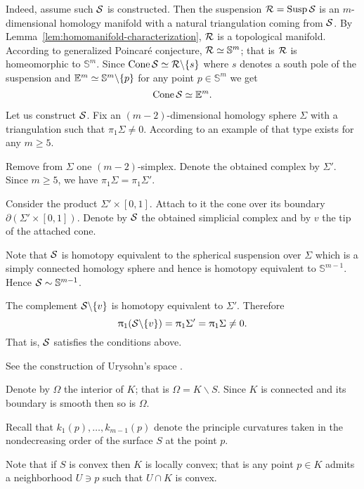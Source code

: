 Indeed, assume such $\mathcal{S}$ is constructed.
Then the suspension
$\spc{R}\z=\Susp\spc{S}$
is an $m$-dimensional homology manifold with a natural triangulation coming from $\mathcal{S}$.
By Lemma~\ref{lem:homomanifold-characterization},
$\mathcal{R}$ is a topological manifold.
According to generalized Poincar\'{e} conjecture,
$\mathcal{R}\simeq\mathbb{S}^m$;
that is
$\mathcal{R}$ is homeomorphic to $\mathbb{S}^m$.
Since $\mathop{\rm Cone}\nolimits \mathcal{S}\simeq \mathcal{R}\backslash\{s\}$ where $s$ denotes a south pole of the suspension 
and $\mathbb{E}^m\simeq \mathbb{S}^m\backslash\{p\}$
for any point $p\in \mathbb{S}^m$
we get 
\[\mathop{\rm Cone}\nolimits \mathcal{S}\simeq\mathbb{E}^m.\]

Let us construct $\mathcal{S}$.
Fix an $(m-2)$-dimensional homology sphere $\Sigma$ with a triangulation such that $\pi_1\Sigma\ne0$.
According to \cite{kervaire} %
an example of that type exists for any $m\ge 5$.

Remove from $\Sigma$ one $(m-2)$-simplex.
Denote the obtained complex by $\Sigma'$.
Since $m\ge 5$, we have $\pi_1\Sigma=\pi_1\Sigma'$.

Consider the product $\Sigma'\times [0,1]$. 
Attach to it the cone over its boundary $\partial (\Sigma'\times [0,1])$.
Denote by $\mathcal{S}$ the obtained simplicial complex
and by $v$ the tip of the attached cone.

Note that $\mathcal{S}$ is homotopy equivalent to the spherical suspension over $\Sigma$ which is a simply connected homology sphere and hence is homotopy equivalent to $\mathbb{S}^{m-1}$.
  Hence  $\mathcal{S}\sim\mathbb{S}^{m-1}$.

The complement $\mathcal{S}\backslash\{v\}$ is homotopy equivalent to $\Sigma'$.
Therefore 
\[
\uppi_1(\mathcal{S}\backslash\{v\})
=\uppi_1\Sigma'
=\uppi_1\Sigma\ne 0.
\]
That is, $\mathcal{S}$ satisfies the conditions above.

 See the construction of Urysohn's space \cite[3.11$\tfrac{3}{2}_+$]{gromov-MS}.

Denote by $\Omega$ the interior of $K$; that is $\Omega=K\backslash S$.
Since $K$ is connected and its boundary is smooth then so is $\Omega$.

Recall that $k_1(p),\dots, k_{m-1}(p)$ denote the principle curvatures taken in the nondecreasing order of the surface $S$ at the point $p$. 

Note that if $S$ is convex then $K$ is locally convex;
that is any point $p\in K$ admits a neighborhood $U\ni p$ such that $U\cap K$ is convex.

